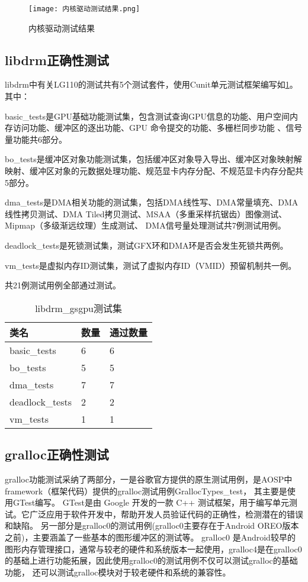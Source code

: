 \begin{figure}[H]
    \centering
    \texttt{[image: 内核驱动测试结果.png]}
    \caption{内核驱动测试结果}
    \label{fig:内核驱动测试结果}
\end{figure}

\subsection{libdrm正确性测试}
libdrm中有关LG110的测试共有5个测试套件，使用Cunit单元测试框架编写如\ref{tab:libdrm_gsgpu测试集}。其中：

basic\_tests是GPU基础功能测试集，包含测试查询GPU信息的功能、用户空间内存访问功能、缓冲区的逐出功能、GPU 命令提交的功能、多栅栏同步功能 、信号量功能共6部分。

bo\_tests是缓冲区对象功能测试集，包括缓冲区对象导入导出、缓冲区对象映射解映射、缓冲区对象的元数据处理功能、规范显卡内存分配、不规范显卡内存分配共5部分。

dma\_tests是DMA相关功能的测试集，包括DMA线性写、DMA常量填充、DMA线性拷贝测试、DMA Tiled拷贝测试、MSAA（多重采样抗锯齿）图像测试、Mipmap（多级渐远纹理）生成测试、
DMA信号量处理测试共7例测试用例。

deadlock\_tests是死锁测试集，测试GFX环和DMA环是否会发生死锁共两例。

vm\_tests是虚拟内存ID测试集，测试了虚拟内存ID（VMID）预留机制共一例。

共21例测试用例全部通过测试。

\begin{table}[H]
    \centering
    \caption{libdrm\_gsgpu测试集}
    \label{tab:libdrm_gsgpu测试集}
    \begin{tabular}{lll}
      \toprule
      类名   &  数量  &通过数量\\
      \midrule
      basic\_tests & 6 & 6\\
      bo\_tests & 5 & 5\\
      dma\_tests & 7 & 7\\
      deadlock\_tests & 2 &2\\
      vm\_tests & 1 &1\\
      \bottomrule
    \end{tabular}
    \note{}
\end{table}

\subsection{gralloc正确性测试}
gralloc功能测试采纳了两部分，一是谷歌官方提供的原生测试用例，是AOSP中framework（框架代码）提供的gralloc测试用例GrallocTypes\_test，
其主要是使用GTest编写。
GTest\cite{GoogleTest}是由 Google 开发的一款 C++ 测试框架，用于编写单元测试。它广泛应用于软件开发中，帮助开发人员验证代码的正确性，检测潜在的错误和缺陷。
另一部分是gralloc0的测试用例(gralloc0主要存在于Android OREO版本之前)，主要涵盖了一些基本的图形缓冲区的测试等。
gralloc0 是Android较早的图形内存管理接口，通常与较老的硬件和系统版本一起使用，gralloc4是在gralloc0的基础上进行功能拓展，因此使用gralloc0的测试用例不仅可以测试gralloc的基础功能，
还可以测试gralloc模块对于较老硬件和系统的兼容性。

